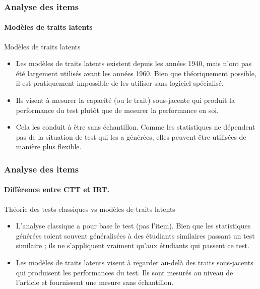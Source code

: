 \documentclass[aspectratio=169,professionalfonts, 12pt]{beamer}
\begin{document}
\begin{frame}
  \frametitle{Analyse des items}
  \framesubtitle{Modèles de traits latents}
  \justifying 
  \begin{minipage}{\textwidth}
  \begin{block}{Modèles de traits latents}
    \begin{itemize}
      \item	Les modèles de traits latents existent depuis les années 1940, mais n'ont pas été largement utilisés avant les années 1960. Bien que théoriquement possible, il est pratiquement impossible de les utiliser sans logiciel spécialisé.
      \item	Ils visent à mesurer la capacité (ou le trait) sous-jacente qui produit la performance du test plutôt que de mesurer la performance en soi.
      \item	Cela les conduit à être sans échantillon. Comme les statistiques ne dépendent pas de la situation de test qui les a générées, elles peuvent être utilisées de manière plus flexible.
      
    \end{itemize}
  \end{block}  
  \end{minipage} 
\end{frame}

\begin{frame}
  \frametitle{Analyse des items}
  \framesubtitle{Différence entre CTT et IRT.}
  \justifying 
  \begin{minipage}{\textwidth}
  \begin{block}{Théorie des tests classiques vs modèles de traits latents}
    \begin{itemize}
      \item	L'analyse classique a pour base le test (pas l'item). Bien que les statistiques générées soient souvent généralisées à des étudiants similaires passant un test similaire ; ils ne s'appliquent vraiment qu'aux étudiants qui passent ce test.
      \item	Les modèles de traits latents visent à regarder au-delà des traits sous-jacents qui produisent les performances du test. Ils sont mesurés au niveau de l'article et fournissent une mesure sans échantillon.  
    \end{itemize}
  \end{block}  
  \end{minipage} 
\end{frame}
\end{document}
